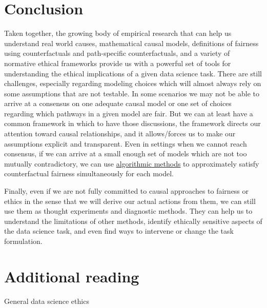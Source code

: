 \documentclass[]{book}
\theoremstyle{definition}
\theoremstyle{definition}
\theoremstyle{definition}
\theoremstyle{remark}
\begin{document}
\section{Conclusion}\label{conclusion}

Taken together, the growing body of empirical research that can help us
understand real world causes, mathematical causal models, definitions of
fairness using counterfactuals and path-specific counterfactuals, and a
variety of normative ethical frameworks provide us with a powerful set
of tools for understanding the ethical implications of a given data
science task. There are still challenges, especially regarding modeling
choices which will almost always rely on some assumptions that are not
testable. In some scenarios we may not be able to arrive at a consensus
on one adequate causal model or one set of choices regarding which
pathways in a given model are fair. But we can at least have a common
framework in which to have those discussions, the framework directs our
attention toward causal relationships, and it allows/forces us to make
our assumptions explicit and transparent. Even in settings when we
cannot reach consensus, if we can arrive at a small enough set of models
which are not too mutually contradictory, we can use
\href{https://papers.nips.cc/paper/7220-when-worlds-collide-integrating-different-counterfactual-assumptions-in-fairness}{algorithmic
methods} to approximately satisfy counterfactual fairness simultaneously
for each model.

Finally, even if we are not fully committed to causal approaches to
fairness or ethics in the sense that we will derive our actual actions
from them, we can still use them as thought experiments and diagnostic
methods. They can help us to understand the limitations of other
methods, identify ethically sensitive aspects of the data science task,
and even find ways to intervene or change the task formulation.

\section{Additional reading}\label{additional-reading}

General data science ethics
\end{document}
